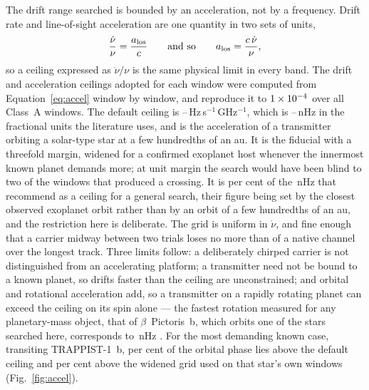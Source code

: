 The drift range searched is bounded by an acceleration, not by a
frequency. Drift rate and line-of-sight acceleration are one quantity in
two sets of units,
%
\begin{equation}
\frac{\dot\nu}{\nu}=\frac{a_{\rm los}}{c}
\qquad\text{and so}\qquad
a_{\rm los}=\frac{c\,\dot\nu}{\nu},
\label{eq:accel}
\end{equation}
%
so a ceiling expressed as $\dot\nu/\nu$ is the same physical limit in
every band. The drift and acceleration ceilings adopted for each window
were computed from Equation~\ref{eq:accel} window by window, and
reproduce it to $1\times10^{-4}$ over all \DriftRelNWin{} Class~A windows.
The default
ceiling is \DriftCeilLo--\DriftCeilHi\,Hz\,s$^{-1}$\,GHz$^{-1}$, which is
\DriftCeilLo--\DriftCeilHi\,nHz in the fractional units the literature
uses, and is the acceleration of a transmitter orbiting a solar-type star
at a few hundredths of an au. It is the \citet{Mason2025} fiducial with a
threefold margin, widened for a confirmed exoplanet host whenever the
innermost known planet demands more; at unit margin the search would have
been blind to two of the windows that produced a crossing. It is
\AccelSheikhPct{} per cent of the \AccelSheikhNHz\,nHz that
\citet{Sheikh2019} recommend as a ceiling for a general search, their figure
being set by the closest observed exoplanet orbit rather than by an orbit of
a few hundredths of an au, and the restriction here is deliberate. The grid is uniform
in $\dot\nu$, and fine enough
that a carrier midway between two trials loses no more than
\DriftGridFineHalf{} of a native channel over the longest track. Three
limits follow: a deliberately chirped carrier is not distinguished from an
accelerating platform; a transmitter need not be bound to a known planet,
so drifts faster than the ceiling are unconstrained; and orbital and
rotational acceleration add, so a transmitter on a rapidly rotating planet
can exceed the ceiling on its spin alone --- the fastest rotation measured for
any planetary-mass object, that of $\beta$~Pictoris~b, which orbits one of the
stars searched here, corresponds to \AccelBpicRotNHz\,nHz
\citep{Sheikh2019}. For the most demanding known case,
transiting TRAPPIST-1~b, \TrapPhaseHi{} per cent of the orbital phase lies
above the default ceiling and \TrapPhaseLo{} per cent above the widened
grid used on that star's own windows (Fig.~\ref{fig:accel}).

